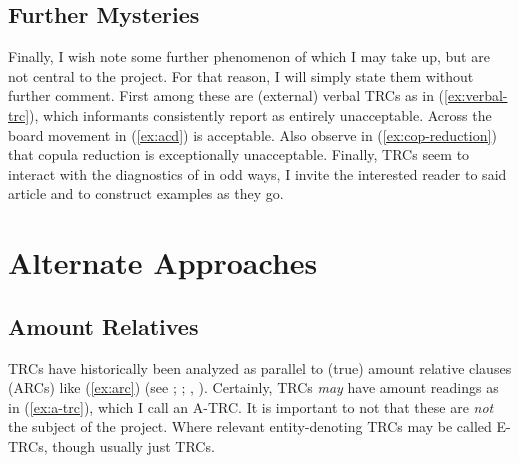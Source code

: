 \documentclass[11pt]{article}
\begin{document}
\begin{exe}
	\label{ex:mixed}
	\label{ex:split}
\end{exe}

\subsection{Further Mysteries}

Finally, I wish note some further phenomenon of which I may take up, but are not central to the project. For that reason, I will simply state them without further comment. First among these are (external) verbal TRCs as in (\ref{ex:verbal-trc}), which informants consistently report as entirely unacceptable. Across the board movement in (\ref{ex:acd}) is acceptable. Also observe in (\ref{ex:cop-reduction}) that copula reduction is exceptionally unacceptable. Finally, TRCs seem to interact with the diagnostics of \citet{postalContrastingExtractionTypes1994} in odd ways, I invite the interested reader to said article and to construct examples as they go.

\begin{exe}
	\label{ex:verbal-trc}
	\label{ex:acd}
	\label{ex:cop-reduction}
\end{exe}

\section{Alternate Approaches}

\subsection{Amount Relatives}

TRCs have historically been analyzed as parallel to (true) amount relative clauses (ARCs) like (\ref{ex:arc}) (see \cite{carlsonAmountRelatives1977}; \cite{heimWhereDoesDefiniteness1987}; \cite{grosuStrangeRelativesThird1998}, \citeyear{grosuAmountRelatives2017}). Certainly, TRCs \textit{may} have amount readings as in (\ref{ex:a-trc}), which I call an A-TRC. It is important to not that these are \textit{not} the subject of the project. Where relevant entity-denoting TRCs may be called E-TRCs, though usually just TRCs.
\end{document}
